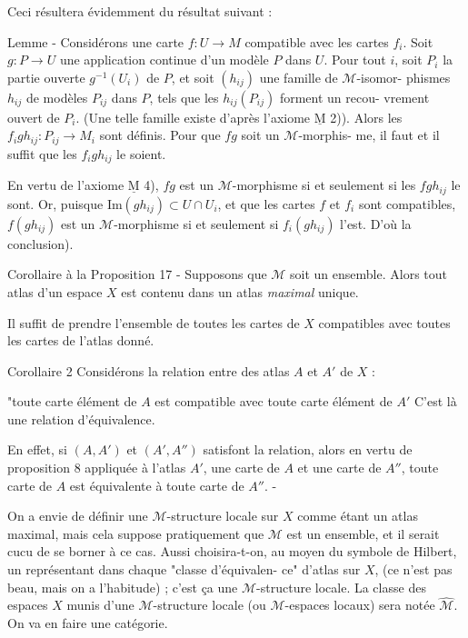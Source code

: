 Ceci résultera évidemment du résultat suivant :

Lemme - Considérons une carte $f:U \to M$ compatible avec les cartes $f_i$. Soit
$g:P \to U$ une application continue d'un modèle $P$ dans $U$. Pour tout $i$, soit
$P_i$ la partie ouverte $g^{-1}(U_i)$ de $P$, et soit $(h_{ij})$ une famille de $\mathcal{M}$-isomor-
phismes $h_{ij}$ de modèles $P_{ij}$ dans $P$, tels que les $h_{ij}(P_{ij})$ forment un recou-
vrement ouvert de $P_i$. (Une telle famille existe d'après l'axiome $\underline{\text{M}}$ 2)).
Alors les $f_i g h_{ij} : P_{ij} \to M_i$ sont définis. Pour que $fg$ soit un $\mathcal{M}$-morphis-
me, il faut et il suffit que les $f_i g h_{ij}$ le soient.

En vertu de l'axiome $\underline{\text{M}}$ 4), $fg$ est un $\mathcal{M}$-morphisme si et seulement si
les $f g h_{ij}$ le sont. Or, puisque $\text{Im}(g h_{ij}) \subset U \cap U_i$, et que les cartes $f$ et $f_i$
sont compatibles, $f(g h_{ij})$ est un $\mathcal{M}$-morphisme si et seulement si $f_i(g h_{ij})$
l'est. D'où la conclusion).

Corollaire à la Proposition 17 - Supposons que $\mathcal{M}$ soit un ensemble.
Alors tout atlas d'un espace $X$ est contenu dans un atlas \emph{maximal} unique.

Il suffit de prendre l'ensemble de toutes les cartes de $X$ compatibles
avec toutes les cartes de l'atlas donné.

Corollaire 2 Considérons la relation entre des atlas $A$ et $A'$ de $X$ :

\newpage



"toute carte élément de $A$ est compatible avec toute carte élément de $A'$
C'est là une relation d'équivalence.

En effet, si $(A,A')$ et $(A',A'')$ satisfont la relation, alors en
vertu de proposition 8 appliquée à l'atlas $A'$, une carte de $A$ et une
carte de $A''$, toute carte de $A$ est équivalente à toute carte de $A''$. -

On a envie de définir une $\mathcal{M}$-structure locale sur $X$ comme étant un
atlas maximal, mais cela suppose pratiquement que $\mathcal{M}$ est un ensemble,
et il serait cucu de se borner à ce cas. Aussi choisira-t-on, au moyen
du symbole de Hilbert, un représentant dans chaque "classe d'équivalen-
ce" d'atlas sur $X$, (ce n'est pas beau, mais on a l'habitude) ; c'est
ça une $\mathcal{M}$-structure locale. La classe des espaces $X$ munis d'une
$\mathcal{M}$-structure locale (ou $\mathcal{M}$-espaces locaux) sera notée $\hat{\mathcal{M}}$. On va en
faire une catégorie.

